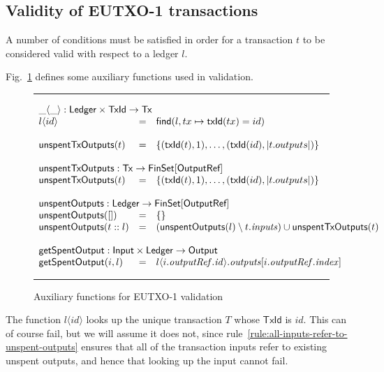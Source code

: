 \documentclass[a4paper]{article}
\newcommand{\s}{\textsf}  %
\newcommand{\msf}[1]{\ensuremath{\mathsf{#1}}}
\newcommand{\mi}[1]{\ensuremath{\mathit{#1}}}
\newcommand\rfskip{7pt}
\newenvironment{ruledfigure}[1]{\begin{figure}[#1]\hrule\vspace{\rfskip}}{\vspace{\rfskip}\hrule\end{figure}}
\newcommand{\FinSet}[1]{\ensuremath{\s{FinSet}[#1]}}
\newcommand{\TxId}{\ensuremath{\s{TxId}}}
\newcommand{\txId}{\msf{txId}}
\newcommand{\idx}{\mi{index}}
\newcommand{\inputs}{\mi{inputs}}
\newcommand{\outputs}{\mi{outputs}}
\newcommand{\outputref}{\mi{outputRef}}
\newcommand{\id}{\mi{id}}
\newcommand{\lookupTx}[2]{#1\langle#2\rangle}
\newcommand{\getSpent}{\msf{getSpentOutput}}
\newcommand{\unspent}{\msf{unspentOutputs}}
\newcommand{\txunspent}{\msf{unspentTxOutputs}}
\newcommand{\eutxotx}{\msf{Tx}}
\newcommand{\emptymap}{\ensuremath{\{\}}}
\begin{document}
\subsection{Validity of EUTXO-1 transactions}
\label{sec:eutxo-1-validity}
A number of conditions must be satisfied in order for a transaction
$t$ to be considered valid with respect to a ledger $l$.

Fig.~\ref{fig:validation-functions-1} defines some auxiliary functions used in validation.
\begin{ruledfigure}{H}
  \begin{displaymath}
  \begin{array}{lll}
  \multicolumn{3}{l}{\lookupTx{\_}{\_} : \s{Ledger} \times \TxId \rightarrow \eutxotx{}}\\
  \lookupTx{l}{id} &=& \textsf{find}(l, tx \mapsto \txId(tx) = id)\\
  \\
  \txunspent(t) &=& \{(\txId(t),1), \ldots, (\txId(id),\left|t.outputs\right|)\}\\
  \\
  \multicolumn{3}{l}{\txunspent : \eutxotx \rightarrow \FinSet{\s{OutputRef}}}\\
  \txunspent(t) &=& \{(\txId(t),1), \ldots, (\txId(id),\left|t.outputs\right|)\}\\
  \\
  \multicolumn{3}{l}{\unspent : \s{Ledger} \rightarrow \FinSet{\s{OutputRef}}}\\
  \unspent([]) &=& \emptymap \\
  \unspent(t::l) &=& (\unspent(l) \setminus t.\inputs) \cup \txunspent(t)\\
  \\
  \multicolumn{3}{l}{\getSpent : \s{Input} \times \s{Ledger} \rightarrow \s{Output}}\\
  \getSpent(i,l) &=& l\langle i.\outputref.\id \rangle.\outputs[i.\outputref.\idx]
  \end{array}
  \end{displaymath}
  \caption{Auxiliary functions for EUTXO-1 validation}
  \label{fig:validation-functions-1}
\end{ruledfigure}

\noindent The function $\lookupTx{l}{id}$ looks up the unique transaction
$T$ whose $\TxId$ is $id$. This can of course fail, but we will assume it does
not, since rule~\ref{rule:all-inputs-refer-to-unspent-outputs} ensures that all
of the transaction inputs refer to existing unspent outputs, and hence that
looking up the input cannot fail.
\end{document}
